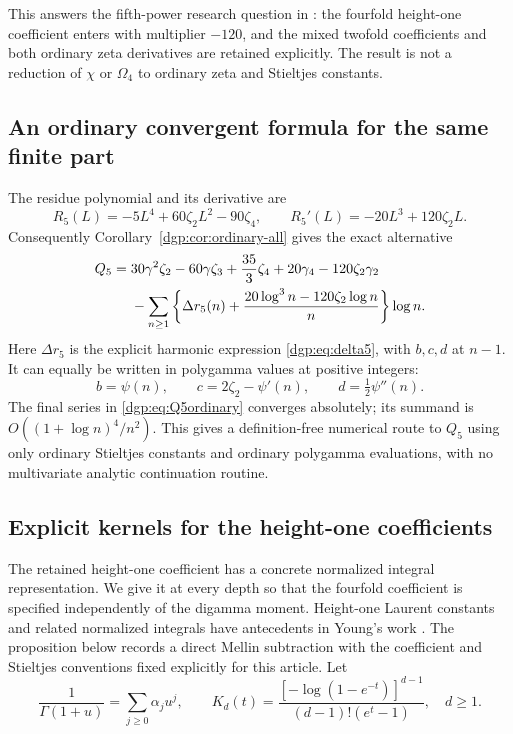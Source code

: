 This answers the fifth-power research question in \cite{dgp:reports}:
the fourfold height-one coefficient enters with multiplier $-120$,
and the mixed twofold coefficients and both ordinary zeta derivatives
are retained explicitly.  The result is not a reduction of $\chi$
or $\Omega_4$ to ordinary zeta and Stieltjes constants.

\subsection{An ordinary convergent formula for the same finite part}

The residue polynomial and its derivative are
\[
 R_5(L)=-5L^4+60\zeta_2L^2-90\zeta_4,
 \qquad R_5'(L)=-20L^3+120\zeta_2L.
\]
Consequently Corollary~\ref{dgp:cor:ordinary-all} gives the exact alternative
\begin{align}
 Q_5={}&30\gamma^2\zeta_2-60\gamma\zeta_3+\frac{35}{3}\zeta_4
                   +20\gamma_4-120\zeta_2\gamma_2
 \notag\\
 &-\sum_{n\ge1}
  \left\{\Delta r_5(n)
           +\frac{20\log^3n-120\zeta_2\log n}{n}\right\}\log n.
 \label{dgp:eq:Q5ordinary}
\end{align}
Here $\Delta r_5$ is the explicit harmonic expression
\eqref{dgp:eq:delta5}, with $b,c,d$ at $n-1$.
It can equally be written in polygamma values at positive integers:
\begin{equation}
 b=\psi(n),\qquad c=2\zeta_2-\psi'(n),\qquad
 d=\tfrac12\psi''(n).
 \label{dgp:eq:polygamma5}
\end{equation}
The final series in \eqref{dgp:eq:Q5ordinary} converges absolutely;
its summand is $O((1+\log n)^4/n^2)$.
This gives a definition-free numerical route to $Q_5$ using only
ordinary Stieltjes constants and ordinary polygamma evaluations,
with no multivariate analytic continuation routine.

\subsection{Explicit kernels for the height-one coefficients}
\label{dgp:subsec:heightkernel}

The retained height-one coefficient has a concrete normalized
integral representation.  We give it at every depth so that the
fourfold coefficient is specified independently of the digamma moment.
Height-one Laurent constants and related normalized integrals have
antecedents in Young's work \cite[Section~4]{dgp:Young}.  The proposition
below records a direct Mellin subtraction with the coefficient and
Stieltjes conventions fixed explicitly for this article.
Let
\begin{equation}
 \frac1{\Gamma(1+u)}=\sum_{j\ge0}\alpha_ju^j,\qquad
 K_d(t)=\frac{[-\log(1-e^{-t})]^{d-1}}
                       {(d-1)!(e^t-1)},\quad d\ge1.
 \label{dgp:eq:Kd}
\end{equation}

